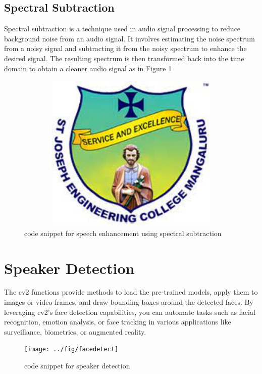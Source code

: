 \documentclass[12pt,a4paper]{report}
\begin{document}
\subsection{Spectral Subtraction}
Spectral subtraction is a technique used in audio signal processing to reduce background noise from an audio signal. It involves estimating the noise spectrum from a noisy signal and subtracting it from the noisy spectrum to enhance the desired signal. The resulting spectrum is then transformed back into the time domain to obtain a cleaner audio signal as in Figure \ref{fig:pic3}
\newpage
\begin{figure}[hbtp]
\centering
\includegraphics[width=5in,height=3in]{pic/sjeclogo.png}
\caption{code snippet for speech enhancement using spectral subtraction}
\label{fig:pic3}
\end{figure}

\section{Speaker Detection}
\par The cv2 functions provide methods to load the pre-trained models, apply them to images or video frames, and draw bounding boxes around the detected faces. By leveraging cv2's face detection capabilities, you can automate tasks such as facial recognition, emotion analysis, or face tracking in various applications like surveillance, biometrics, or augmented reality.


\begin{figure}[hbtp]
\centering
\texttt{[image: ../fig/facedetect]}
\caption{code snippet for speaker detection}
\end{figure}
\end{document}
